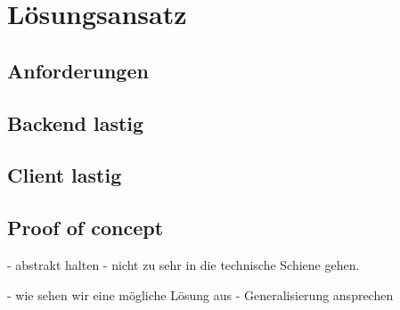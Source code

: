 \chapter{Lösungsansatz}

\section{Anforderungen}


\section{Backend lastig}

\section{Client lastig}

\section{Proof of concept}


- abstrakt halten
- nicht zu sehr in die technische Schiene gehen. 

- wie sehen wir eine mögliche Lösung aus
- Generalisierung ansprechen